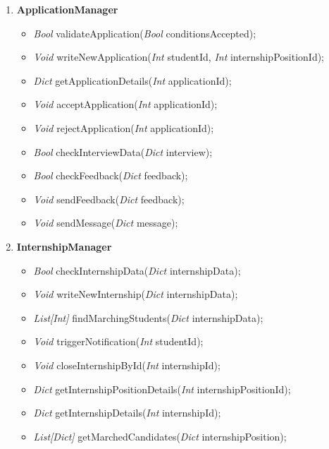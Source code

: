 \begin{enumerate}
    \item \textbf{ApplicationManager}
    \begin{itemize}
        \item \textit{Bool} validateApplication(\textit{Bool} conditionsAccepted);  %
        \item \textit{Void} writeNewApplication(\textit{Int} studentId, \textit{Int} internshipPositionId); %
        \item \textit{Dict} getApplicationDetails(\textit{Int} applicationId);      %
        \item \textit{Void} acceptApplication(\textit{Int} applicationId);          %
        \item \textit{Void} rejectApplication(\textit{Int} applicationId);          %
        \item \textit{Bool} checkInterviewData(\textit{Dict} interview);            %
        \item \textit{Bool} checkFeedback(\textit{Dict} feedback);                  %
        \item \textit{Void} sendFeedback(\textit{Dict} feedback);                   %
        \item \textit{Void} sendMessage(\textit{Dict} message);                     %
    \end{itemize}

    \item \textbf{InternshipManager}
    \begin{itemize}
        \item \textit{Bool} checkInternshipData(\textit{Dict} internshipData);                  %
        \item \textit{Void} writeNewInternship(\textit{Dict} internshipData);                   %
        \item \textit{List[Int]} findMarchingStudents(\textit{Dict} internshipData);            %
        \item \textit{Void} triggerNotification(\textit{Int} studentId);                        %
        \item \textit{Void} closeInternshipById(\textit{Int} internshipId);                     %
        \item \textit{Dict} getInternshipPositionDetails(\textit{Int} internshipPositionId);    %
        \item \textit{Dict} getInternshipDetails(\textit{Int} internshipId);                    %
        \item \textit{List[Dict]} getMarchedCandidates(\textit{Dict} internshipPosition);       %
    \end{itemize}
\end{enumerate} 

